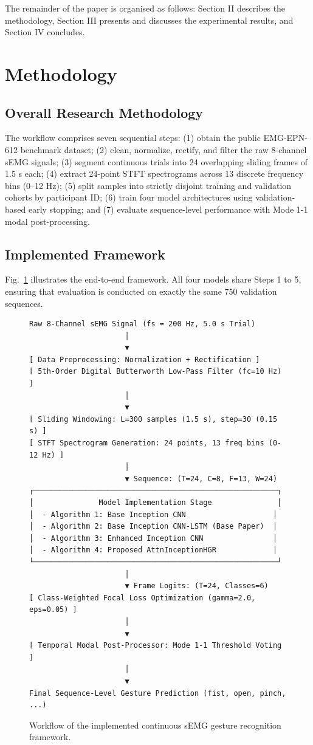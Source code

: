 \documentclass[conference]{IEEEtran}
\begin{document}
The remainder of the paper is organised as follows: Section II describes the methodology, Section III presents and discusses the experimental results, and Section IV concludes.

\section{Methodology}

\subsection{Overall Research Methodology}
The workflow comprises seven sequential steps: (1) obtain the public EMG-EPN-612 benchmark dataset; (2) clean, normalize, rectify, and filter the raw 8-channel sEMG signals; (3) segment continuous trials into 24 overlapping sliding frames of 1.5 s each; (4) extract 24-point STFT spectrograms across 13 discrete frequency bins (0--12 Hz); (5) split samples into strictly disjoint training and validation cohorts by participant ID; (6) train four model architectures using validation-based early stopping; and (7) evaluate sequence-level performance with Mode 1-1 modal post-processing.

\subsection{Implemented Framework}
Fig.~\ref{fig:workflow} illustrates the end-to-end framework. All four models share Steps 1 to 5, ensuring that evaluation is conducted on exactly the same 750 validation sequences.

\begin{figure}[h]
\centering
\begin{verbatim}
Raw 8-Channel sEMG Signal (fs = 200 Hz, 5.0 s Trial)
                      │
                      ▼
[ Data Preprocessing: Normalization + Rectification ]
[ 5th-Order Digital Butterworth Low-Pass Filter (fc=10 Hz) ]
                      │
                      ▼
[ Sliding Windowing: L=300 samples (1.5 s), step=30 (0.15 s) ]
[ STFT Spectrogram Generation: 24 points, 13 freq bins (0-12 Hz) ]
                      │
                      ▼ Sequence: (T=24, C=8, F=13, W=24)
┌────────────────────────────────────────────────────────┐
│               Model Implementation Stage               │
│  - Algorithm 1: Base Inception CNN                    │
│  - Algorithm 2: Base Inception CNN-LSTM (Base Paper)  │
│  - Algorithm 3: Enhanced Inception CNN                │
│  - Algorithm 4: Proposed AttnInceptionHGR             │
└────────────────────────────────────────────────────────┘
                      │
                      ▼ Frame Logits: (T=24, Classes=6)
[ Class-Weighted Focal Loss Optimization (gamma=2.0, eps=0.05) ]
                      │
                      ▼
[ Temporal Modal Post-Processor: Mode 1-1 Threshold Voting ]
                      │
                      ▼
Final Sequence-Level Gesture Prediction (fist, open, pinch, ...)
\end{verbatim}
\caption{Workflow of the implemented continuous sEMG gesture recognition framework.}
\label{fig:workflow}
\end{figure}
\end{document}
